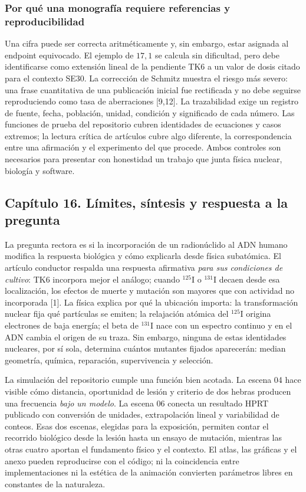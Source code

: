 \documentclass[11pt,a4paper,oneside]{article}
\begin{document}
\subsubsection{Por qué una monografía requiere referencias y reproducibilidad}
Una cifra puede ser correcta aritméticamente y, sin embargo, estar
asignada al endpoint equivocado. El ejemplo de $17,1$ se calcula
sin dificultad, pero debe identificarse como extensión lineal de la
pendiente TK6 a un valor de dosis citado para el contexto SE30.
La corrección de Schmitz muestra el riesgo más severo: una frase
cuantitativa de una publicación inicial fue rectificada y no debe
seguirse reproduciendo como tasa de aberraciones [9,12]. La
trazabilidad exige un registro de fuente, fecha, población, unidad,
condición y significado de cada número. Las funciones de prueba del
repositorio cubren identidades de ecuaciones y casos extremos; la
lectura crítica de artículos cubre algo diferente, la correspondencia
entre una afirmación y el experimento del que procede. Ambos controles
son necesarios para presentar con honestidad un trabajo que junta
física nuclear, biología y software.

\clearpage
\subsection{Capítulo 16. Límites, síntesis y respuesta a la pregunta}
\label{ampliacion-conclusiones}

La pregunta rectora es si la incorporación de un radionúclido al ADN humano
modifica la respuesta biológica y cómo explicarla desde física subatómica.
El artículo conductor respalda una respuesta afirmativa \emph{para sus
condiciones de cultivo}: TK6 incorpora mejor el análogo; cuando
$^{125}$I o $^{131}$I decaen desde esa localización, los efectos de
muerte y mutación son mayores que con actividad no incorporada [1].
La física explica por qué la ubicación importa: la transformación
nuclear fija qué partículas se emiten; la relajación atómica del $^{125}$I
origina electrones de baja energía; el beta de $^{131}$I nace con un
espectro continuo y en el ADN cambia el origen de su traza. Sin embargo,
ninguna de estas identidades nucleares, por sí sola, determina cuántos
mutantes fijados aparecerán: median geometría, química, reparación,
supervivencia y selección.

La simulación del repositorio cumple una función bien acotada. La escena
04 hace visible cómo distancia, oportunidad de lesión y criterio de dos
hebras producen una frecuencia \emph{bajo un modelo}. La escena 06 conecta
un resultado HPRT publicado con conversión de unidades, extrapolación
lineal y variabilidad de conteos. Esas dos escenas, elegidas para la
exposición, permiten contar el recorrido biológico desde la lesión hasta
un ensayo de mutación, mientras las otras cuatro aportan el fundamento
físico y el contexto. El atlas, las gráficas y el anexo pueden reproducirse
con el código; ni la coincidencia entre implementaciones ni la estética
de la animación convierten parámetros libres en constantes de la naturaleza.
\end{document}
